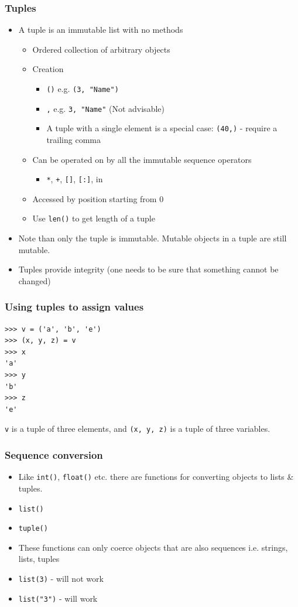 \documentclass{beamer}
\begin{document}
\begin{frame}
\frametitle{Tuples}
\begin{itemize}
\item A tuple is an immutable list with no methods
\begin{itemize}
\item Ordered collection of arbitrary objects
\item Creation 
\begin{itemize}
\item \texttt{()} e.g. \texttt{(3, "Name")} 
\item \texttt{,} e.g. \texttt{3, "Name"}  (Not advisable)
\item A tuple with a single element is a special case:
\texttt{(40,)} - require a trailing comma
\end{itemize}
\item Can be operated on by all the immutable sequence operators
\begin{itemize}
\item \texttt{*}, \texttt{+}, \texttt{[]}, \texttt{[:]}, in 
\end{itemize}
\item Accessed by position starting from 0
\item Use \texttt{len()} to get length of a tuple
\end{itemize}
\item Note than only the tuple is immutable. Mutable objects in a tuple are still mutable.
\item Tuples provide integrity (one needs to be sure that something cannot be changed)
\end{itemize}
\end{frame}

\begin{frame}[containsverbatim]
\frametitle{Using tuples to assign values}
\begin{lstlisting}
>>> v = ('a', 'b', 'e')
>>> (x, y, z) = v     
>>> x
'a'
>>> y
'b'
>>> z
'e'
\end{lstlisting}
\texttt{v} is a tuple of three elements, and \texttt{(x, y, z)} is a tuple of three variables. 
\end{frame}

\begin{frame}
\frametitle{Sequence conversion}
\begin{itemize}
\item Like \texttt{int()}, \texttt{float()} etc. there are functions for converting objects to lists \& tuples.
\item \texttt{list()}
\item \texttt{tuple()}
\item These functions can only coerce objects that are also sequences i.e. strings, lists, tuples
\item \texttt{list(3)} - will not work
\item \texttt{list("3")} - will work
\end{itemize}
\end{frame}
\end{document}

